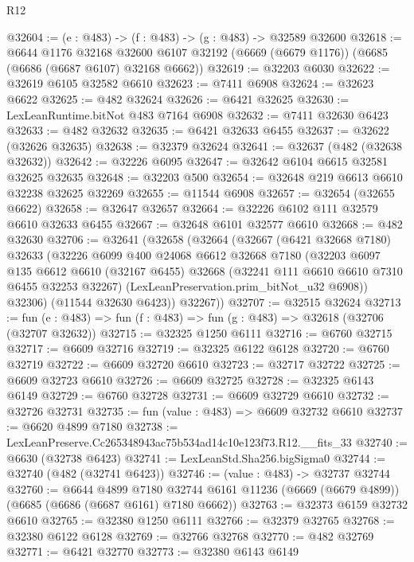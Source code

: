 \begin{lexlean}{R12}
\begin{coremodule}
@32604 := (e : @483) -> (f : @483) -> (g : @483) -> @32589 @32600
@32618 := @6644
    @1176
    @32168
    @32600
    @6107
    @32192
    (@6669 (@6679 @1176))
    (@6685 (@6686 (@6687 @6107) @32168 @6662))
@32619 := @32203 @6030
@32622 := @32619 @6105 @32582 @6610
@32623 := @7411 @6908
@32624 := @32623 @6622
@32625 := @482 @32624
@32626 := @6421 @32625
@32630 := LexLeanRuntime.bitNot @483 @7164 @6908
@32632 := @7411 @32630 @6423
@32633 := @482 @32632
@32635 := @6421 @32633 @6455
@32637 := @32622 (@32626 @32635)
@32638 := @32379 @32624
@32641 := @32637 (@482 (@32638 @32632))
@32642 := @32226 @6095
@32647 := @32642 @6104 @6615 @32581 @32625 @32635
@32648 := @32203 @500
@32654 := @32648 @219 @6613 @6610 @32238 @32625 @32269
@32655 := @11544 @6908
@32657 := @32654 (@32655 @6622)
@32658 := @32647 @32657
@32664 := @32226 @6102 @111 @32579 @6610 @32633 @6455
@32667 := @32648 @6101 @32577 @6610
@32668 := @482 @32630
@32706 := @32641
    (@32658
      (@32664
        (@32667
          (@6421 @32668 @7180)
          @32633
          (@32226
            @6099
            @400
            @24068
            @6612
            @32668
            @7180
            (@32203
              @6097
              @135
              @6612
              @6610
              (@32167 @6455)
              @32668
              (@32241 @111 @6610 @6610 @7310 @6455 @32253 @32267)
              (LexLeanPreservation.prim_bitNot_u32 @6908))
            @32306)
          (@11544 @32630 @6423))
        @32267))
@32707 := @32515 @32624
@32713 := fun (e : @483) => fun (f : @483) => fun (g : @483) => @32618 (@32706 (@32707 @32632))
@32715 := @32325 @1250 @6111
@32716 := @6760 @32715
@32717 := @6609 @32716
@32719 := @32325 @6122 @6128
@32720 := @6760 @32719
@32722 := @6609 @32720 @6610
@32723 := @32717 @32722
@32725 := @6609 @32723 @6610
@32726 := @6609 @32725
@32728 := @32325 @6143 @6149
@32729 := @6760 @32728
@32731 := @6609 @32729 @6610
@32732 := @32726 @32731
@32735 := fun (value : @483) => @6609 @32732 @6610
@32737 := @6620 @4899 @7180
@32738 := LexLeanPreserve.Cc265348943ac75b534ad14c10e123f73.R12.__fits_33
@32740 := @6630 (@32738 @6423)
@32741 := LexLeanStd.Sha256.bigSigma0
@32744 := @32740 (@482 (@32741 @6423))
@32746 := (value : @483) -> @32737 @32744
@32760 := @6644
    @4899
    @7180
    @32744
    @6161
    @11236
    (@6669 (@6679 @4899))
    (@6685 (@6686 (@6687 @6161) @7180 @6662))
@32763 := @32373 @6159 @32732 @6610
@32765 := @32380 @1250 @6111
@32766 := @32379 @32765
@32768 := @32380 @6122 @6128
@32769 := @32766 @32768
@32770 := @482 @32769
@32771 := @6421 @32770
@32773 := @32380 @6143 @6149

\end{coremodule}
\end{lexlean}
